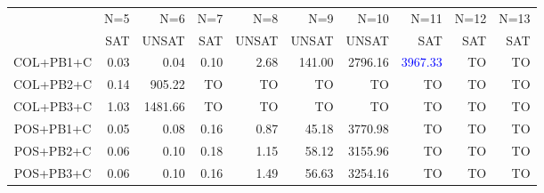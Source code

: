 
\begin{tabular}[c]{|c|r|r|r|r|r|r|r|r|r|}\hline
               & N=5  & N=6     & N=7          & N=8          &    N=9                &   N=10                   &    N=11& N=12& N=13 \\
               & SAT  & UNSAT   & SAT          & UNSAT        &  UNSAT        &  UNSAT         &    SAT & SAT & SAT \\\hline
    COL+PB1+C  & 0.03 & 0.04    & 0.10         & 2.68         & 141.00        & 2796.16        & \textcolor{blue}{3967.33} & TO & TO \\
    COL+PB2+C  & 0.14 & 905.22  & TO           & TO           & TO            & TO             & TO  & TO & TO \\
    COL+PB3+C  & 1.03 & 1481.66 & TO           & TO           & TO            & TO             & TO  & TO & TO \\
    POS+PB1+C  & 0.05 & 0.08    & 0.16         & 0.87         & 45.18 & 3770.98&             TO &  TO & TO \\
    POS+PB2+C  & 0.06 & 0.10    & 0.18         & 1.15         & 58.12 & 3155.96&             TO &  TO & TO \\
    POS+PB3+C  & 0.06 & 0.10    & 0.16                   & 1.49         & 56.63   & 3254.16                  &  TO & TO & TO\\\hline
\end{tabular}
